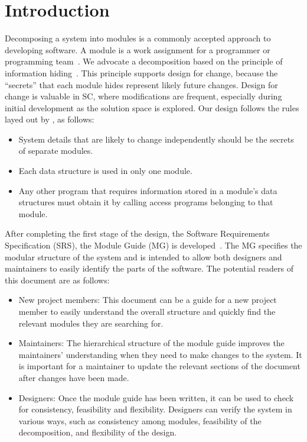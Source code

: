 \documentclass[12pt, titlepage]{article}
\begin{document}
	\section{Introduction}
	Decomposing a system into modules is a commonly accepted approach to 
	developing software.  A module is a work assignment for a programmer or 
	programming team~\citep{ParnasEtAl1984}.  We advocate a decomposition
	based on the principle of information hiding~\citep{Parnas1972a}.  This
	principle supports design for change, because the ``secrets'' that each 
	module hides represent likely future changes.  Design for change is 
	valuable in SC, where modifications are frequent, especially during initial 
	development as the solution space is explored. Our design follows the rules 
	layed out by \citet{ParnasEtAl1984}, as follows:
	\begin{itemize}
	\item System details that are likely to change independently should be the 
	secrets of separate modules.
	\item Each data structure is used in only one module.
	\item Any other program that requires information stored in a module's data 
	structures must obtain it by calling access programs belonging to that 
	module.
	\end{itemize}
	After completing the first stage of the design, the Software Requirements
	Specification (SRS), the Module Guide (MG) is 
	developed~\citep{ParnasEtAl1984}. 
	The MG specifies the modular structure of the system and is intended to 
	allow both designers and maintainers to easily identify the parts of the 
	software.  The potential readers of this document are as follows:
	\begin{itemize}
	\item New project members: This document can be a guide for a new project 
	member to easily understand the overall structure and quickly find the 
	relevant modules they are searching for.
	\item Maintainers: The hierarchical structure of the module guide improves 
	the maintainers' understanding when they need to make changes to the 
	system. It is important for a maintainer to update the relevant sections of 
	the document after changes have been made.
	\item Designers: Once the module guide has been written, it can be used to 
	check for consistency, feasibility and flexibility. Designers can verify 
	the system in various ways, such as consistency among modules, feasibility 
	of the decomposition, and flexibility of the design.
	\end{itemize}
\end{document}
